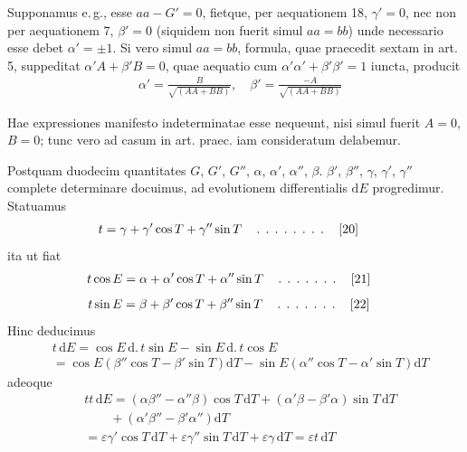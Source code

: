 Supponamus e.\,g., esse $aa-G'=0$, fietque, per aequationem 18, $\gamma'=0$,
nec non per aequationem 7, $\beta'=0$ (siquidem non fuerit simul $aa=bb$)
unde necessario esse debet $\alpha'=\pm1$. Si vero simul $aa=bb$, formula, quae
praecedit sextam in art. 5, suppeditat $\alpha'A+\beta'B=0$, quae aequatio cum
$\alpha'\alpha'+\beta'\beta'=1$ iuncta, producit
\[
\begin{aligned}
&\alpha'=\frac{B}{\surd{(AA+BB)}},\quad
\beta'=\frac{-A}{\surd{(AA+BB)}}
\end{aligned}
\]
\par Hae expressiones manifesto indeterminatae esse nequeunt, nisi simul fuerit
$A=0$, $B=0$; tunc vero ad casum in art. praec. iam consideratum delabemur.


Postquam duodecim quantitates $G$, $G'$, $G''$, $\alpha$, $\alpha'$, $\alpha''$, $\beta$. $\beta'$, $\beta''$, $\gamma$, $\gamma'$, $\gamma''$ complete
determinare docuimus, ad evolutionem differentialis $\mathrm dE$ progredimur.
Statuamus
\[
\begin{aligned}
&t=\gamma+\gamma'\cos T+\gamma''\sin T\quad
\mathinner{\ldotp\;\ldotp\;\ldotp\;\ldotp\;\ldotp\;\ldotp\;\ldotp\;\ldotp}\quad[20]
\end{aligned}
\]
ita ut fiat
\[
\begin{aligned}
&t\cos E=\alpha+\alpha'\cos T+\alpha''\sin T\quad
\mathinner{\ldotp\;\ldotp\;\ldotp\;\ldotp\;\ldotp\;\ldotp\;\ldotp}\quad[21]
\end{aligned}
\]
\[
\begin{aligned}
&t\sin E=\beta+\beta'\cos T+\beta''\sin T\quad
\mathinner{\ldotp\;\ldotp\;\ldotp\;\ldotp\;\ldotp\;\ldotp\;\ldotp}\quad[22]
\end{aligned}
\]
Hinc deducimus
\[
\begin{aligned}
&t\,\mathrm dE=\cos E\,\mathrm d.\,t\sin E-\sin E\,\mathrm d.\,t\cos E\\[8pt]
&=\cos E(\beta''\cos T-\beta'\sin T)\mathrm dT
-\sin E(\alpha''\cos T-\alpha'\sin T)\mathrm dT
\end{aligned}
\]
adeoque
\[
\begin{aligned}
&tt\,\mathrm dE=(\alpha\beta''-\alpha''\beta)\cos T\,\mathrm dT
+(\alpha'\beta-\beta'\alpha)\sin T\,\mathrm dT
\\[6pt]
&\qquad{}+(\alpha'\beta''-\beta'\alpha'')\mathrm dT\\[8pt]
&=\varepsilon\gamma'\cos T\,\mathrm dT
+\varepsilon\gamma''\sin T\,\mathrm dT
+\varepsilon\gamma\,\mathrm dT=\varepsilon t\,\mathrm dT
\end{aligned}
\]
